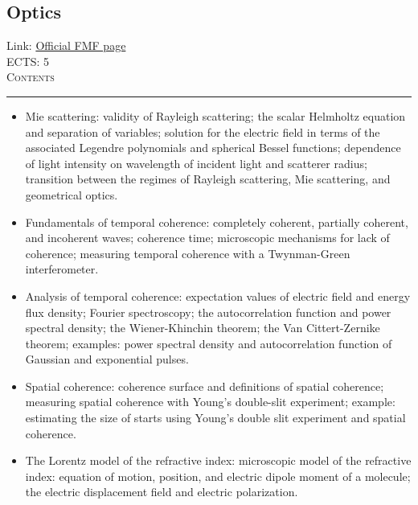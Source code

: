 \documentclass[11pt, a4paper]{article}
\newenvironment{course}[3]{
\subsection{#1}%
Link: \href{#2}{Official FMF page}\\%
ECTS: #3%
\vspace{1ex}
\\
{\large \textsc{Contents}}\\[-0.9ex]%
\rule{\textwidth}{0.5pt}
\vspace{-3ex}
}
{}
\newenvironment{chapter}[1]{
\begin{tcolorbox}[title=#1, breakable]
}
{\end{tcolorbox}}
\begin{document}
\begin{course}{Optics}{https://www.fmf.uni-lj.si/en/study-physics/programmes/1fiz/2020/7000777/courses/1165/}{5}
\begin{chapter}{Optical scattering}
\begin{itemize}
            \item Mie scattering: validity of Rayleigh scattering; the scalar Helmholtz equation and separation of variables; solution for the electric field in terms of the associated Legendre polynomials and spherical Bessel functions; dependence of light intensity on wavelength of incident light and scatterer radius; transition between the regimes of Rayleigh scattering, Mie scattering, and geometrical optics.
        
        \end{itemize}
    \end{chapter}

    \begin{chapter}{Coherence}
        \begin{itemize}
        
            \item Fundamentals of temporal coherence: completely coherent, partially coherent, and incoherent waves; coherence time; microscopic mechanisms for lack of coherence; measuring temporal coherence with a Twynman-Green interferometer.

            \item Analysis of temporal coherence: expectation values of electric field and energy flux density; Fourier spectroscopy; the autocorrelation function and power spectral density; the Wiener-Khinchin theorem; the Van Cittert-Zernike theorem; examples: power spectral density and autocorrelation function of Gaussian and exponential pulses.

            \item Spatial coherence: coherence surface and definitions of spatial coherence; measuring spatial coherence with Young's double-slit experiment; example: estimating the size of starts using Young's double slit experiment and spatial coherence.
        
        \end{itemize}
    \end{chapter}

    \begin{chapter}{The refractive index}
        \begin{itemize}
        
            \item The Lorentz model of the refractive index: microscopic model of the refractive index: equation of motion, position, and electric dipole moment of a molecule; the electric displacement field and electric polarization.


\end{itemize}
\end{chapter}
\end{course}
\end{document}
